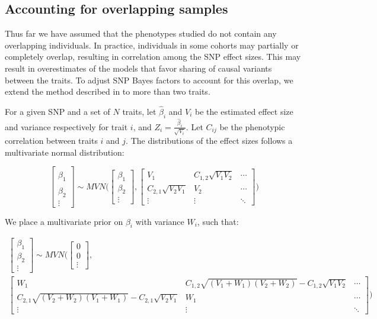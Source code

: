 \documentclass{article}
\begin{document}
\subsection{Accounting for overlapping samples}
Thus far we have assumed that the phenotypes studied do not contain any overlapping individuals. In practice, individuals in some cohorts may partially or completely overlap, resulting in correlation among the SNP effect sizes. This may result in overestimates of the models that favor sharing of causal variants between the traits. To adjust SNP Bayes factors to account for this overlap, we extend the method described in \cite{Pickrell:2016aa} to more than two traits.

For a given SNP and a set of $N$ traits, let $\hat{\beta}_i$ and $V_i$ be the estimated effect size and variance respectively for trait $i$, and $Z_i = \frac{\hat{\beta}_i}{\sqrt{V_i}}$. Let $C_{ij}$ be the phenotypic correlation between traits $i$ and $j$. The distributions of the effect sizes follows a multivariate normal distribution:

\begin{equation}
\begin{bmatrix}
\hat{\beta}_1 \\
\hat{\beta}_2 \\
\vdots
\end{bmatrix}
\sim MVN \Bigg(
\begin{bmatrix}
\beta_1 \\
\beta_2 \\
\vdots
\end{bmatrix},
\begin{bmatrix}
V_1 & C_{1,2} \sqrt{V_1 V_2} & \cdots \\
C_{2,1} \sqrt{V_2 V_1} & V_2 & \cdots \\
\vdots & \vdots & \ddots
\end{bmatrix}
\Bigg)
\end{equation}

\noindent We place a multivariate prior on $\beta_i$ with variance $W_i$, such that:

\begin{multline}
\begin{bmatrix}
\beta_1 \\
\beta_2 \\
\vdots
\end{bmatrix}
\sim MVN \Bigg(
\begin{bmatrix}
0 \\
0 \\
\vdots
\end{bmatrix}, \\
\begin{bmatrix}
W_1 & C_{1,2} \sqrt{(V_1 + W_1)(V_2 + W_2)} - C_{1,2} \sqrt{V_1 V_2} & \cdots \\
C_{2,1} \sqrt{(V_2 + W_2) (V_1 + W_1)} - C_{2,1} \sqrt{V_2 V_1} & W_1 & \cdots \\
\vdots & \vdots & \ddots
\end{bmatrix}
\Bigg)
\end{multline}
\end{document}
